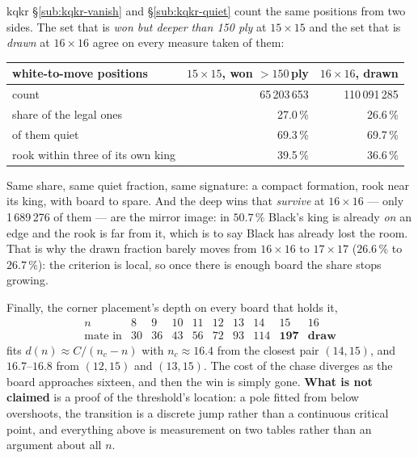 \documentclass[11pt]{article}
\begin{document}
\begin{result}[title={The class that flips is one class, and it can be recognised}]{kqkr}
\S\ref{sub:kqkr-vanish} and \S\ref{sub:kqkr-quiet} count the same positions from two sides. The set that is
\emph{won but deeper than 150 ply} at $15\times15$ and the set that is
\emph{drawn} at $16\times16$ agree on every measure taken of them:

\begin{center}\small
\begin{tabular}{@{}lrr@{}}
\toprule
white-to-move positions & $15\times15$, won ${>}150$\,ply & $16\times16$, drawn \\
\midrule
count                              & 65\,203\,653 & 110\,091\,285 \\
share of the legal ones            & 27.0\,\%     & 26.6\,\% \\
of them quiet                      & 69.3\,\%     & 69.7\,\% \\
rook within three of its own king  & 39.5\,\%     & 36.6\,\% \\
\bottomrule
\end{tabular}
\end{center}

\smallskip
Same share, same quiet fraction, same signature: a compact formation, rook near
its king, with board to spare. And the deep wins that \emph{survive} at
$16\times16$ --- only 1\,689\,276 of them --- are the mirror image: in
$50.7\,\%$ Black's king is already \emph{on} an edge and the rook is far from
it, which is to say Black has already lost the room. That is why the drawn
fraction barely moves from $16\times16$ to $17\times17$ ($26.6\,\%$ to
$26.7\,\%$): the criterion is local, so once there is enough board the share
stops growing.
\end{result}

\noindent
Finally, the corner placement's depth on every board that holds it,
\[
  \begin{array}{l|ccccccccc}
    n & 8 & 9 & 10 & 11 & 12 & 13 & 14 & 15 & 16\\\hline
    \text{mate in} & 30 & 36 & 43 & 56 & 72 & 93 & 114 & \mathbf{197} &
      \textbf{draw}
  \end{array}
\]
fits $d(n) \approx C/(n_c-n)$ with $n_c \approx 16.4$ from the closest pair
$(14,15)$, and $16.7$--$16.8$ from $(12,15)$ and $(13,15)$. The cost of the
chase diverges as the board approaches sixteen, and then the win is simply
gone. \textbf{What is not claimed} is a proof of the threshold's location: a
pole fitted from below overshoots, the transition is a discrete jump rather
than a continuous critical point, and everything above is measurement on two
tables rather than an argument about all $n$.
\end{document}
